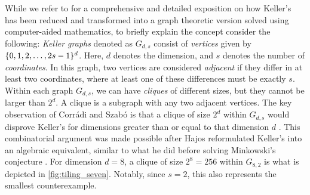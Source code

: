 \documentclass[../thesis.tex]{subfiles}
\begin{document}
While we refer to \cite{brakensiekResolutionKellerConjecture2020} for a comprehensive and detailed exposition on how Keller's  has been reduced and transformed into a graph theoretic version solved using computer-aided mathematics, to briefly explain the concept consider the following: \emph{Keller graphs} denoted as $G_{d,s}$ consist of \emph{vertices} given by $\{0,1,2,\dots,2s-1\}^d$. Here, $d$ denotes the dimension, and $s$ denotes the number of \emph{coordinates}. In this graph, two vertices are considered \emph{adjacent} if they differ in at least two coordinates, where at least one of these differences must be exactly $s$. Within each graph $G_{d,s}$, we can have \emph{cliques} of different sizes, but they cannot be larger than $2^d$. A clique is a subgraph with any two adjacent vertices. The key observation of Corr{\'a}di and Szab{\'o} is that a clique of size $2^d$ within $G_{d,s}$ would disprove Keller's  for dimensions greater than or equal to that dimension $d$ \cite{corradiCombinatorialApproachKeller1990}. This combinatorial argument was made possible after Hajos reformulated Keller's  into an algebraic equivalent, similar to what he did before solving Minkowski's conjecture \cite{lagariasKellerCubetilingConjecture1992,hajosUeberEinfacheUnd1942}. For dimension $d=8$, a clique of size $2^8=256$ within $G_{8,2}$ is what is depicted in \cref{fig:tiling_seven}. Notably, since $s=2$, this also represents the smallest counterexample. %
\end{document}
